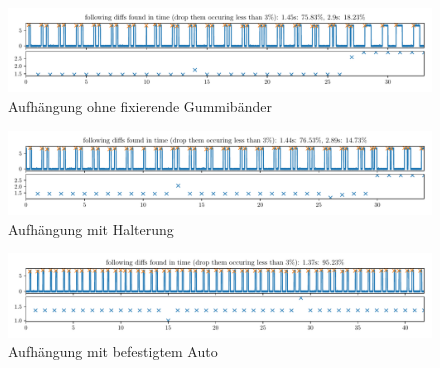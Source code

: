 \documentclass[10pt]{article}
\begin{document}
\begin{figure}[htbp]
    \centering
    \includegraphics[width=\textwidth]{figures/AufhaengungohneGummi.pdf}
    \caption{Aufhängung ohne fixierende Gummibänder}\label{fig:AufhaengungohneGummi}
\end{figure}
\begin{figure}[htbp]
    \centering
    \includegraphics[width=\textwidth]{figures/AufhaengungmitGummi.pdf}
    \caption{Aufhängung mit Halterung}\label{fig:AufhaengungmitGummi}
\end{figure}
\begin{figure}[htbp]
    \centering
    \includegraphics[width=\textwidth]{figures/AufhaengungmitGummiundAuto.pdf}
    \caption{Aufhängung mit befestigtem Auto}\label{fig:AufhaengungmitGummiundAuto}
\end{figure}

\newpage
\end{document}
